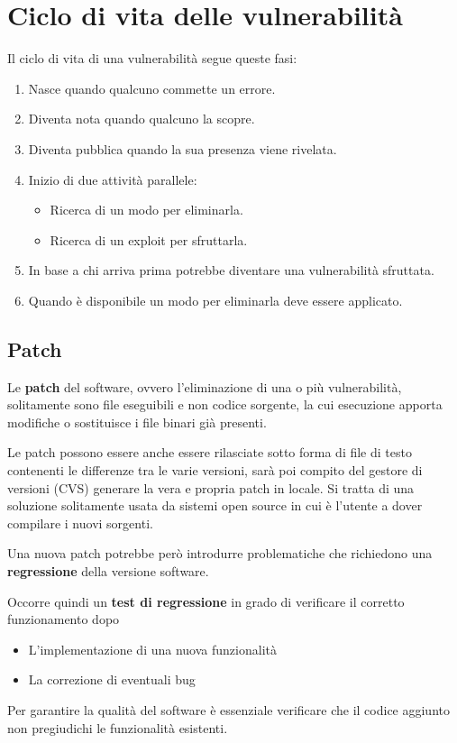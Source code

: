 \section{Ciclo di vita delle vulnerabilità}
Il ciclo di vita di una vulnerabilità segue queste fasi:
\begin{enumerate}
	\item Nasce quando qualcuno commette un errore.
	\item Diventa nota quando qualcuno la scopre.
	\item Diventa pubblica quando la sua presenza viene rivelata.
	\item Inizio di due attività parallele:
	      \begin{itemize}
		      \item Ricerca di un modo per eliminarla.
		      \item Ricerca di un exploit per sfruttarla.
	      \end{itemize}
	\item In base a chi arriva prima potrebbe diventare una vulnerabilità sfruttata.
	\item Quando è disponibile un modo per eliminarla deve essere applicato.
\end{enumerate}

\subsection{Patch}
Le \textbf{patch} del software, ovvero l'eliminazione di una o più vulnerabilità, solitamente sono file eseguibili e
non codice sorgente, la cui esecuzione apporta modifiche o sostituisce i file binari già presenti.

Le patch possono essere anche essere rilasciate sotto forma di file di testo contenenti le differenze tra le varie
versioni, sarà poi compito del gestore di versioni (CVS) generare la vera e propria patch in locale. Si tratta di una
soluzione solitamente usata da sistemi open source in cui è l'utente a dover compilare i nuovi sorgenti.

Una nuova patch potrebbe però introdurre problematiche che richiedono una \textbf{regressione} della versione software.

Occorre quindi un \textbf{test di regressione} in grado di verificare il corretto funzionamento dopo
\begin{itemize}
	\item L'implementazione di una nuova funzionalità
	\item La correzione di eventuali bug
\end{itemize}
Per garantire la qualità del software è essenziale verificare che il codice aggiunto non pregiudichi le funzionalità
esistenti.